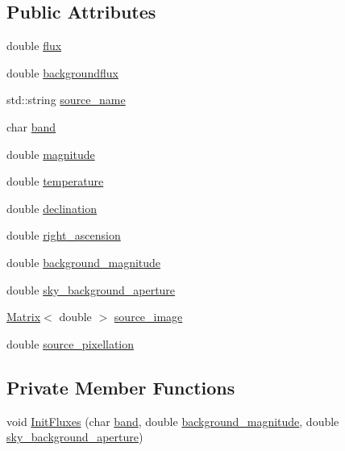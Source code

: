 \subsection*{Public Attributes}
\begin{DoxyCompactItemize}
\item 
double \hyperlink{classSource_a8888be0016028aa59006fa6d9fc7c575}{flux}
\item 
double \hyperlink{classSource_ac6515686d4bbb766ae14e1360fdf1c97}{backgroundflux}
\item 
std::string \hyperlink{classSource_aca080db4a19c5a8c149b6362aedcb0cd}{source\_\-name}
\item 
char \hyperlink{classSource_a380447fc2b80c1b6bc5c2a8b31ed6b98}{band}
\item 
double \hyperlink{classSource_a6a63845ae2495f7d0b9758e969ae34a5}{magnitude}
\item 
double \hyperlink{classSource_a01ad608788eb4c0e4a7b2a6228398394}{temperature}
\item 
double \hyperlink{classSource_acd65dbd79034b6bd27ce7bea9cddf80b}{declination}
\item 
double \hyperlink{classSource_a3378987660510b2ab4f02db5aa81791e}{right\_\-ascension}
\item 
double \hyperlink{classSource_af8077dd4bf90295d11680d6dbd0baea9}{background\_\-magnitude}
\item 
double \hyperlink{classSource_aa21a6313f7ab7c41bb206ed05f0909cc}{sky\_\-background\_\-aperture}
\item 
\hyperlink{classMatrix}{Matrix}$<$ double $>$ \hyperlink{classSource_ae39e6de7004f8f12968f38352c6c0f5e}{source\_\-image}
\item 
double \hyperlink{classSource_ad8a9910f6a3d807ac0e1b42195ba4147}{source\_\-pixellation}
\end{DoxyCompactItemize}
\subsection*{Private Member Functions}
\begin{DoxyCompactItemize}
\item 
void \hyperlink{classSource_a6ddbe3353cd4d57bcad7010c70a1b06c}{InitFluxes} (char \hyperlink{classSource_a380447fc2b80c1b6bc5c2a8b31ed6b98}{band}, double \hyperlink{classSource_af8077dd4bf90295d11680d6dbd0baea9}{background\_\-magnitude}, double \hyperlink{classSource_aa21a6313f7ab7c41bb206ed05f0909cc}{sky\_\-background\_\-aperture})
\end{DoxyCompactItemize}


